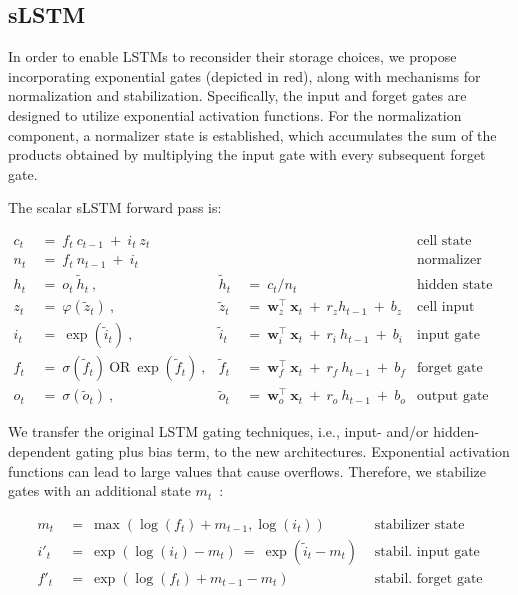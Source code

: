 \subsection{sLSTM}
\label{sec:sLSTM}

In order to enable LSTMs to reconsider their storage choices, we propose incorporating exponential gates (depicted in red), along with mechanisms for normalization and stabilization. Specifically, the input and forget gates are designed to utilize exponential activation functions. For the normalization component, a normalizer state is established, which accumulates the sum of the products obtained by multiplying the input gate with every subsequent forget gate.

The scalar sLSTM forward pass is:

\begin{align}
\label{eq:slstmforward}
c_t \ &= \  f_t \ c_{t-1} \ + \ i_t \ z_t & & 
 &\text{cell state} \\
n_t \ &= \  f_t \ n_{t-1} \ + \ i_t  & & 
 &\text{normalizer state} \\
h_t \ &= \ o_t \ \tilde{h}_t \ ,
  &\tilde{h}_t \ &= \ c_t / n_t
&\text{hidden state} \\
z_t \ &= \ \varphi \left( \tilde{z}_t \right) \ , 
  &\tilde{z}_t \ &=  \ \mathbf{w}^\top_{z} \ \mathbf{x}_t \ + \
  r_{z}  h_{t-1} \ + \  b_{z}
  &\text{cell input} \\
i_t \ &= \ \!\exp \left( \tilde{i}_t  \right) \ , 
  &\tilde{i}_t \ &= \ \mathbf{w}^\top_{i} \ \mathbf{x}_t \ + \
  r_{i}  \ h_{t-1} \ + \  b_{i}
  &\text{input gate} \\
f_t \ &= \ \sigma \left(  \tilde{f}_t \right) \ \text{OR} \
\!\exp \left(  \tilde{f}_t \right) \ ,
  &\tilde{f}_t \ &= \ \mathbf{w}^\top_{f} \ \mathbf{x}_t  \ + \
  r_{f}  \ h_{t-1} \ + \  b_{f}
  &\text{forget gate} \\
o_t \ &= \ \sigma \left( \tilde{o}_t \right) \ , 
  &\tilde{o}_t  \ &= \ \mathbf{w}^\top_{o} \ \mathbf{x}_t \ + \
  r_{o}  \ h_{t-1} \ + \  b_{o}
  &\text{output gate} 
\end{align}

We transfer the original LSTM gating techniques, i.e., input- and/or hidden-dependent gating plus bias term, to the new architectures. Exponential activation functions can lead to large values that cause overflows. Therefore, we stabilize gates with an additional state \mbox{$m_t$~\citep{Milakov:18arxiv}}:

\begin{align}
\label{eq:slstmstabil}
m_t \ &= \ \max \left( \log ( f_t ) + m_{t-1} , \log ( i_t ) \right) &\text{stabilizer state} \\
i'_t \ &= \ \!\exp \left( \log \left ( i_t \right) - m_t \right) \ = \ \!\exp \left( \tilde{i}_t - m_t \right) \ \, 
  &\text{stabil. input gate} \\
f'_t \ &= \ \!\exp \left( \log \left( f_t \right) + m_{t-1} - m_t \right) \ \, 
  &\text{stabil. forget gate}
\end{align}

